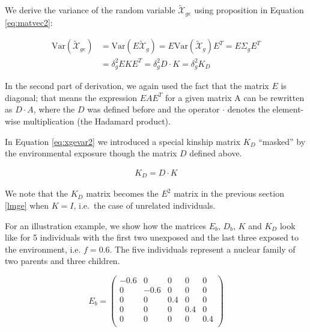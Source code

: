 \documentclass[]{book}
\theoremstyle{definition}
\theoremstyle{definition}
\theoremstyle{definition}
\theoremstyle{remark}
\begin{document}
We derive the variance of the random variable
\(\mathcal{\tilde{X}}_{ge}\) using proposition in Equation
\eqref{eq:matvec2}:

\begin{equation} 
\begin{split}
\mathrm{Var}(\mathcal{\tilde{X}}_{ge}) & = \mathrm{Var}(E \mathcal{\tilde{X}}_g) = E \mathrm{Var}(\mathcal{\tilde{X}}_g) E^T = E \Sigma_g E^T \\ 
 & = \delta_g^2 E K E^T = \delta_g^2 D \cdot K = \delta_g^2 K_{D}
\end{split}
\label{eq:xgevar2}
\end{equation}

In the second part of derivation, we again used the fact that the matrix
\(E\) is diagonal; that means the expression \(E A E^T\) for a given
matrix A can be rewritten as \(D \cdot A\), where the \(D\) was defined
before and the operator \(\cdot\) denotes the element-wise
multiplication (the Hadamard product).

In Equation \eqref{eq:xgevar2} we introduced a special kinship matrix
\(K_{D}\) ``masked'' by the environmental exposure though the matrix
\(D\) defined above.

\begin{equation} 
\begin{split}
K_{D} =  D \cdot K
\end{split}
\label{eq:kd}
\end{equation}

We note that the \(K_{D}\) matrix becomes the \(E^2\) matrix in the
previous section \ref{lmge} when \(K = I\), i.e.~the case of unrelated
individuals.

For an illustration example, we show how the matrices \(E_b\), \(D_b\),
\(K\) and \(K_{D}\) look like for 5 individuals with the first two
unexposed and the last three exposed to the environment, i.e.
\(f = 0.6\). The five individuals represent a nuclear family of two
parents and three children.

\begin{equation*} 
E_b = 
\left(\begin{array}{ccccc}
-0.6 & 0 & 0 & 0 & 0\\
0 & -0.6 & 0 & 0 & 0\\
0 & 0 & 0.4 & 0 & 0\\
0 & 0 & 0 & 0.4 & 0\\
0 & 0 & 0 & 0 & 0.4\\
\end{array}\right)
\end{equation*}
\end{document}

